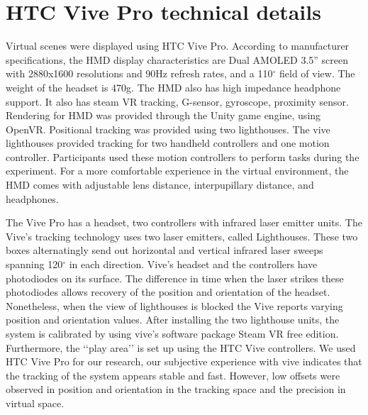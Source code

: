\section{HTC Vive Pro technical details}
Virtual scenes were displayed using HTC Vive Pro. According to manufacturer specifications, the HMD display characteristics are Dual AMOLED 3.5” screen with 2880x1600 resolutions and 90Hz refresh rates, and a 110$^{\circ}$ field of view. The weight of the headset is 470g. The HMD also has high impedance headphone support. It also has steam VR tracking, G-sensor, gyroscope, proximity sensor. Rendering for HMD was provided through the Unity game engine, using OpenVR. Positional tracking was provided using two lighthouses. The vive lighthouses provided tracking for two handheld controllers and one motion controller. Participants used these motion controllers to perform tasks during the experiment. For a more comfortable experience in the virtual environment, the HMD comes with adjustable lens distance, interpupillary distance, and headphones. \par 
The Vive Pro has a headset, two controllers with infrared laser emitter units. The Vive’s tracking technology uses two laser emitters, called Lighthouses. These two boxes alternatingly send out horizontal and vertical infrared laser sweeps spanning 120$^{\circ}$ in each direction. 
Vive’s headset and the controllers have photodiodes on its surface. The difference in time when the laser strikes these photodiodes allows recovery of the position and orientation of the headset. Nonetheless, when the view of lighthouses is blocked the Vive reports varying position and orientation values. 
After installing the two lighthouse units, the system is calibrated by using vive’s software package Steam VR free edition. Furthermore, the ‘‘play area’’ is set up using the HTC Vive controllers. We used HTC Vive Pro for our research, our subjective experience with vive indicates that the tracking of the system appears stable and fast.
However, low offsets were observed in position and orientation in the tracking space and the precision in virtual space. 


